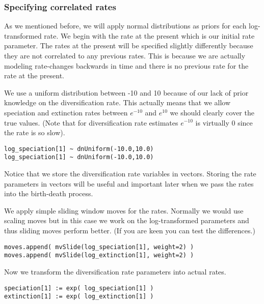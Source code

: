 \subsubsection{Specifying correlated rates}
As we mentioned before, we will apply normal distributions as priors for each log-transformed rate.
We begin with the rate at the present which is our initial rate parameter.
The rates at the present will be specified slightly differently because they are not correlated to any previous rates.
This is because we are actually modeling rate-changes backwards in time and there is no previous rate for the rate at the present.

We use a uniform distribution between -10 and 10 because of our lack of prior knowledge on the diversification rate.
This actually means that we allow speciation and extinction rates between $e^{-10}$ and $e^10$ we should clearly cover the true values.
(Note that for diversification rate estimates $e^{-10}$ is virtually 0 since the rate is so slow).
{\tt \begin{snugshade*}
\begin{lstlisting}
log_speciation[1] ~ dnUniform(-10.0,10.0)
log_speciation[1] ~ dnUniform(-10.0,10.0)
\end{lstlisting}
\end{snugshade*}}
Notice that we store the diversification rate variables in vectors.
Storing the rate parameters in vectors will be useful and important later when we pass the rates into the birth-death process.

We apply simple sliding window moves for the rates.
Normally we would use scaling moves but in this case we work on the log-transformed parameters and thus sliding moves perform better.
(If you are keen you can test the differences.)
{\tt \begin{snugshade*}
\begin{lstlisting}
moves.append( mvSlide(log_speciation[1], weight=2) )
moves.append( mvSlide(log_extinction[1], weight=2) )
\end{lstlisting}
\end{snugshade*}}
Now we transform the diversification rate parameters into actual rates.
{\tt \begin{snugshade*}
\begin{lstlisting}
speciation[1] := exp( log_speciation[1] )
extinction[1] := exp( log_extinction[1] )
\end{lstlisting}
\end{snugshade*}}

